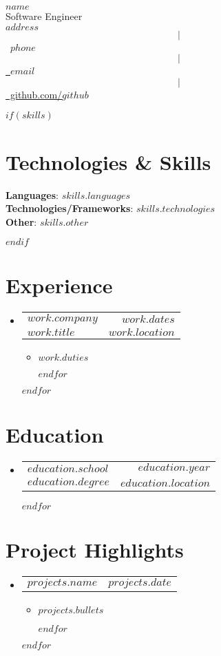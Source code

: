 \documentclass[letterpaper,11pt]{article}
\makeatletter
\newcommand{\resumeItem}[1]{
  \item{
    {#1 \vspace{-2pt}}
  }
}
\newcommand{\resumeSubheading}[4]{
  \vspace{-2pt}\item
    \begin{tabular*}{1.0\textwidth}[t]{l@{\extracolsep{\fill}}r}
      \textbf{#1} & \textbf{\small #2} \\
      \textit{\small#3} & \textit{\small #4} \\
    \end{tabular*}\vspace{-7pt}
}
\newcommand{\resumeProjectHeading}[2]{
    \item
    \begin{tabular*}{1.001\textwidth}{l@{\extracolsep{\fill}}r}
      \small#1 & \textbf{\small #2}\\
    \end{tabular*}\vspace{-7pt}
}
\newcommand{\resumeSubHeadingListStart}{\begin{itemize}[leftmargin=0.0in, label={}]}
\newcommand{\resumeSubHeadingListEnd}{\end{itemize}}
\newcommand{\resumeItemListStart}{\begin{itemize}}
\newcommand{\resumeItemListEnd}{\end{itemize}\vspace{-5pt}}
\makeatother
\begin{document}
\begin{center}
    {\Huge \scshape $name$} \\ \vspace{5pt}
    {\Large Software Engineer} \\ \vspace{5pt}
	\small $address$ $$|$$ \small \raisebox{-0.1\height}\ $phone$ ~ $$|$$ \href{mailto:$email$}{\raisebox{-0.2\height}\  $email$} ~ $$|$$
    \href{https://github.com/$github$}{\raisebox{-0.2\height}\ github.com/$github$}
    \vspace{-8pt}
\end{center}





$if(skills)$
\section{Technologies \& Skills}
\begin{itemize}[leftmargin=0.15in, label={}]
    \small{\item{
    \textbf{Languages}{: $skills.languages$} \\
    \textbf{Technologies/Frameworks}{: $skills.technologies$} \\
    \textbf{Other}{: $skills.other$} \\
    }}
\end{itemize}
\vspace{-20pt}
$endif$



\section{Experience}
  \resumeSubHeadingListStart
  $for(work)$
    \resumeSubheading{$work.company$}{$work.dates$}{$work.title$}{$work.location$}
    \resumeItemListStart
    $for(work.duties)$
      \resumeItem{$work.duties$}
    $endfor$
    \resumeItemListEnd
  $endfor$
  \resumeSubHeadingListEnd

\section{Education}
  \resumeSubHeadingListStart
  $for(education)$  
    \resumeSubheading
    {$education.school$}{$education.year$}
    {$education.degree$}{$education.location$}
    $endfor$
  \resumeSubHeadingListEnd


\section{Project Highlights}
    \vspace{-5pt}
    \resumeSubHeadingListStart
    $for(projects)$
      \resumeProjectHeading
        {\textbf{$projects.name$}}{$projects.date$}
        \resumeItemListStart
        $for(projects.bullets)$
          \resumeItem{$projects.bullets$}
        $endfor$
        \resumeItemListEnd
        \vspace{-13pt}
    $endfor$
    \resumeSubHeadingListEnd
\vspace{5pt}
\end{document}

